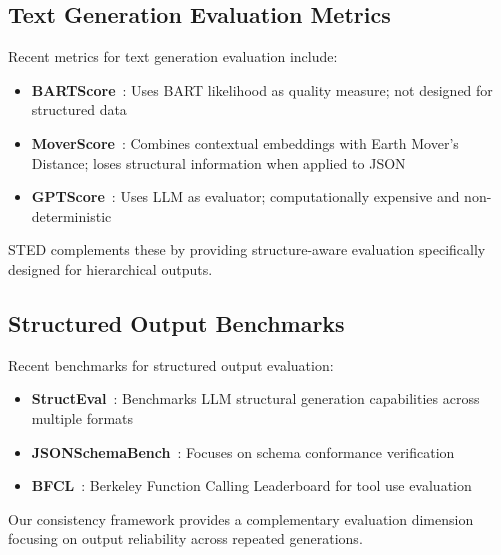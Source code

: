 \documentclass{article}
\begin{document}
\subsection{Text Generation Evaluation Metrics}

Recent metrics for text generation evaluation include:
\begin{itemize}
    \item \textbf{BARTScore}~\cite{yuan2021bartscore}: Uses BART likelihood as quality measure; not designed for structured data
    \item \textbf{MoverScore}~\cite{zhao2019moverscore}: Combines contextual embeddings with Earth Mover's Distance; loses structural information when applied to JSON
    \item \textbf{GPTScore}~\cite{fu2023gptscore}: Uses LLM as evaluator; computationally expensive and non-deterministic
\end{itemize}

STED complements these by providing structure-aware evaluation specifically designed for hierarchical outputs.

\subsection{Structured Output Benchmarks}

Recent benchmarks for structured output evaluation:
\begin{itemize}
    \item \textbf{StructEval}~\cite{yang2025structeval}: Benchmarks LLM structural generation capabilities across multiple formats
    \item \textbf{JSONSchemaBench}~\cite{geng2025generating}: Focuses on schema conformance verification
    \item \textbf{BFCL}~\cite{berkeley2024bfcl}: Berkeley Function Calling Leaderboard for tool use evaluation
\end{itemize}

Our consistency framework provides a complementary evaluation dimension focusing on output reliability across repeated generations.

\end{document}
